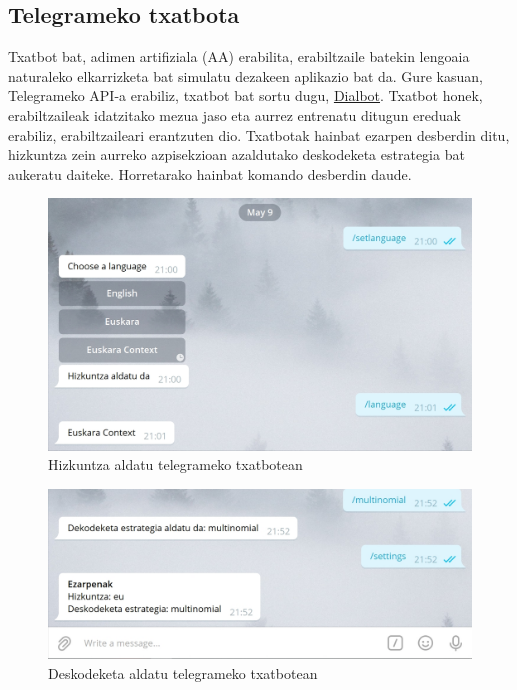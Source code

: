 \documentclass[11pt,a4paper]{article}
\begin{document}
\subsection{Telegrameko txatbota}

Txatbot bat, adimen artifiziala (AA) erabilita, erabiltzaile batekin lengoaia naturaleko elkarrizketa bat simulatu dezakeen aplikazio bat da.
Gure kasuan, Telegrameko API-a erabiliz, txatbot bat sortu dugu, \href{https://t.me/HPDialbot}{Dialbot}. Txatbot honek, erabiltzaileak idatzitako mezua jaso eta aurrez entrenatu ditugun ereduak erabiliz, erabiltzaileari erantzuten dio.
Txatbotak hainbat ezarpen desberdin ditu, hizkuntza zein aurreko azpisekzioan azaldutako deskodeketa estrategia bat aukeratu daiteke. Horretarako hainbat komando desberdin daude.

\begin{figure}
    \centering
    \includegraphics[width=\linewidth]{images/bot_language.jpg}
    \caption{Hizkuntza aldatu telegrameko txatbotean}
    \label{fig:hizkuntza}
\end{figure}

\begin{figure}
    \centering
    \includegraphics[width=\linewidth]{images/bot_decoding.jpg}
    \caption{Deskodeketa aldatu telegrameko txatbotean}
    \label{fig:hizkuntza2}
\end{figure}
\end{document}
